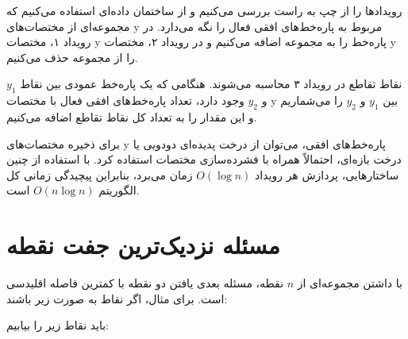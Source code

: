 رویدادها را از چپ به راست بررسی می‌کنیم
و از ساختمان داده‌ای استفاده می‌کنیم که مجموعه‌ای از
مختصات‌های y مربوط به پاره‌خط‌های افقی فعال را نگه می‌دارد.
در رویداد ۱، مختصات y پاره‌خط را به مجموعه اضافه می‌کنیم
و در رویداد ۲، مختصات y را از مجموعه حذف می‌کنیم.

نقاط تقاطع در رویداد ۳ محاسبه می‌شوند.
هنگامی که یک پاره‌خط عمودی بین نقاط
$y_1$ و $y_2$ وجود دارد، تعداد پاره‌خط‌های افقی
فعال با مختصات y بین $y_1$ و $y_2$ را می‌شماریم
و این مقدار را به تعداد کل نقاط تقاطع اضافه می‌کنیم.

برای ذخیره مختصات‌های y پاره‌خط‌های افقی،
می‌توان از درخت پدیده‌ای دودویی یا درخت بازه‌ای،
احتمالاً همراه با فشرده‌سازی مختصات استفاده کرد.
با استفاده از چنین ساختارهایی، پردازش هر رویداد
$O(\log n)$ زمان می‌برد، بنابراین پیچیدگی زمانی
کل الگوریتم $O(n \log n)$ است.

\section{مسئله نزدیک‌ترین جفت نقطه}


با داشتن مجموعه‌ای از $n$ نقطه، مسئله بعدی
یافتن دو نقطه با کمترین فاصله اقلیدسی است.
برای مثال، اگر نقاط به صورت زیر باشند:
\begin{center}
\end{center}
\begin{samepage}
باید نقاط زیر را بیابیم:
\begin{center}
\end{center}
\end{samepage}

